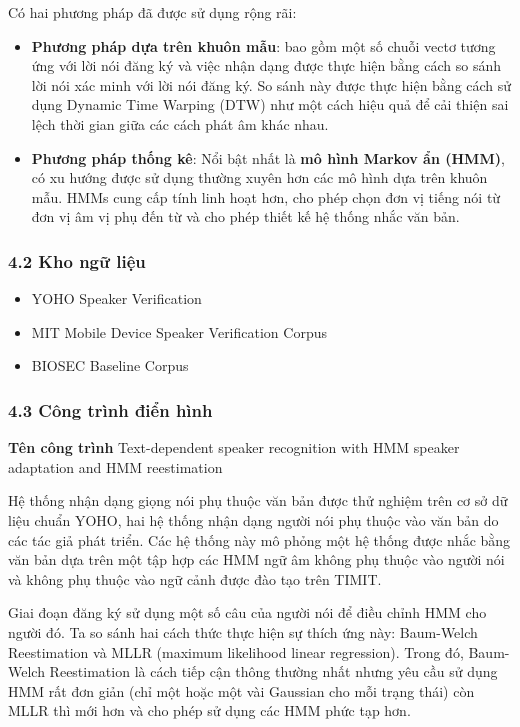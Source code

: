 \documentclass{article}
\begin{document}
	Có hai phương pháp đã được sử dụng rộng rãi: 
	\begin{itemize}
		\item \textbf{Phương pháp dựa trên khuôn mẫu}: bao gồm một số chuỗi vectơ tương ứng với lời nói đăng ký và việc nhận dạng được thực hiện bằng cách so sánh lời nói xác minh với lời nói đăng ký. So sánh này được thực hiện bằng cách sử dụng Dynamic Time Warping (DTW) như một cách hiệu quả để cải thiện sai lệch thời gian giữa các cách phát âm khác nhau.
		\item \textbf{Phương pháp thống kê}: Nổi bật nhất là \textbf{mô hình Markov ẩn (HMM)}, có xu hướng được sử dụng thường xuyên hơn các mô hình dựa trên khuôn mẫu. HMMs cung cấp tính linh hoạt hơn, cho phép chọn đơn vị tiếng nói từ đơn vị âm vị phụ đến từ và cho phép thiết kế hệ thống nhắc văn bản.
	\end{itemize}
	\subsubsection{4.2 Kho ngữ liệu}
	\begin{itemize}
		\item YOHO Speaker Verification
		\item MIT Mobile Device Speaker Verification Corpus
		\item BIOSEC Baseline Corpus
	\end{itemize}
	
	\subsubsection{4.3 Công trình điển hình}
	\textbf{Tên công trình} Text-dependent speaker recognition with HMM speaker adaptation and HMM reestimation 
	
	Hệ thống nhận dạng giọng nói phụ thuộc văn bản được thử nghiệm trên cơ sở dữ liệu chuẩn YOHO, hai hệ thống nhận dạng người nói phụ thuộc vào văn bản do các tác giả phát triển. Các hệ thống này mô phỏng một hệ thống được nhắc bằng văn bản dựa trên một tập hợp các HMM ngữ âm không phụ thuộc vào người nói và không phụ thuộc vào ngữ cảnh được đào tạo trên TIMIT.
	
	Giai đoạn đăng ký sử dụng một số câu của người nói để điều chỉnh HMM cho người đó. Ta so sánh hai cách thức thực hiện sự thích ứng này: Baum-Welch Reestimation và MLLR (maximum likelihood linear regression).
	Trong đó, Baum-Welch Reestimation là cách tiếp cận thông thường nhất nhưng yêu cầu sử dụng HMM rất đơn giản (chỉ một hoặc một vài Gaussian cho mỗi trạng thái) còn MLLR thì mới hơn và cho phép sử dụng các HMM phức tạp hơn.
	
\end{document}
